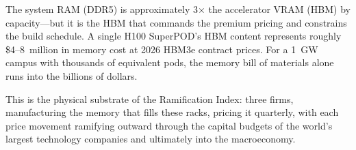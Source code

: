 \documentclass[12pt]{article}
\theoremstyle{definition}
\begin{document}
The system RAM (DDR5) is approximately 3$\times$ the accelerator VRAM (HBM) by capacity---but it is the HBM that commands the premium pricing and constrains the build schedule. A single H100 SuperPOD's HBM content represents roughly \$4--8~million in memory cost at 2026 HBM3e contract prices. For a 1~GW campus with thousands of equivalent pods, the memory bill of materials alone runs into the billions of dollars.

This is the physical substrate of the Ramification Index: three firms, manufacturing the memory that fills these racks, pricing it quarterly, with each price movement ramifying outward through the capital budgets of the world's largest technology companies and ultimately into the macroeconomy.




\end{document}
